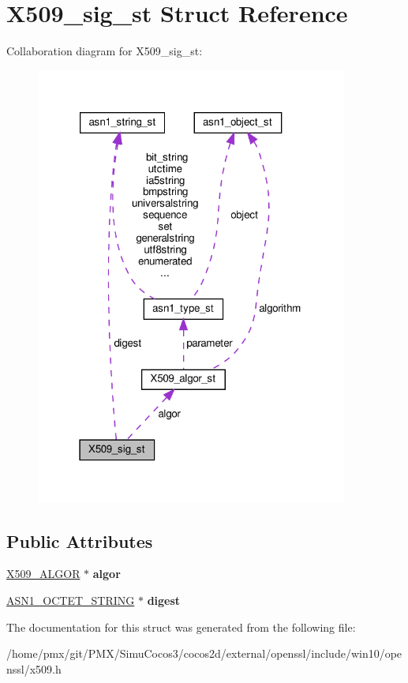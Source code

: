 \hypertarget{structX509__sig__st}{}\section{X509\+\_\+sig\+\_\+st Struct Reference}
\label{structX509__sig__st}


Collaboration diagram for X509\+\_\+sig\+\_\+st\+:
\nopagebreak
\begin{figure}[H]
\begin{center}
\leavevmode
\includegraphics[width=291pt]{structX509__sig__st__coll__graph}
\end{center}
\end{figure}
\subsection*{Public Attributes}
\begin{DoxyCompactItemize}
\item 
\mbox{\label{structX509__sig__st_a40608d2e687f0fd15132db525c18db60}} 
\hyperlink{structX509__algor__st}{X509\+\_\+\+A\+L\+G\+OR} $\ast$ {\bfseries algor}
\item 
\mbox{\label{structX509__sig__st_aef06b1dae888d04a2cdf2f85208d0ba2}} 
\hyperlink{structasn1__string__st}{A\+S\+N1\+\_\+\+O\+C\+T\+E\+T\+\_\+\+S\+T\+R\+I\+NG} $\ast$ {\bfseries digest}
\end{DoxyCompactItemize}


The documentation for this struct was generated from the following file\+:\begin{DoxyCompactItemize}
\item 
/home/pmx/git/\+P\+M\+X/\+Simu\+Cocos3/cocos2d/external/openssl/include/win10/openssl/x509.\+h\end{DoxyCompactItemize}
